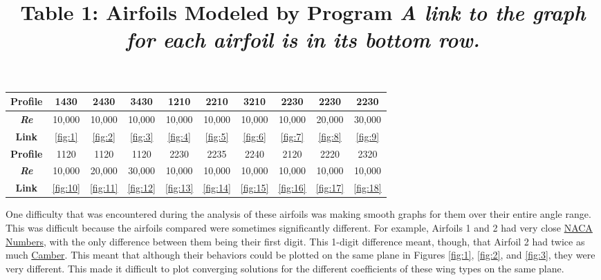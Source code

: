 \documentclass{article}
\begin{document}
\begin{table}[bp]
	\centering
	\title{Table 1: Airfoils Modeled by Program \newline}
	\title{\emph{A link to the graph for each airfoil is in its bottom row.}} \label{table:1}
	\begin{tabular}{ | c | c | c | c | c | c | c | c | c | c |}
		\hline
		 \textbf{Profile} & 1430 & 2430 & 3430 & 1210 & 2210 & 3210 & 2230 & 2230 & 2230 \\ \hline
		 \textbf{\emph{Re}} & 10,000 & 10,000 & 10,000 & 10,000 & 10,000 & 10,000 & 10,000 & 20,000 & 30,000 \\ 
		 \textbf{Link} & \ref{fig:1} & \ref{fig:2} & \ref{fig:3} & \ref{fig:4} & \ref{fig:5} & \ref{fig:6} & \ref{fig:7} & \ref{fig:8} & \ref{fig:9} \\ \hline \hline
		 \newline
		 \textbf{Profile} & 1120 & 1120 & 1120 & 2230 & 2235 & 2240 & 2120 & 2220 & 2320 \\ \hline
		 \textbf{\emph{Re}} & 10,000 & 20,000 & 30,000 & 10,000 & 10,000 & 10,000 & 10,000 & 10,000 & 10,000 \\ 
		 \textbf{Link} & \ref{fig:10} & \ref{fig:11} & \ref{fig:12} & \ref{fig:13} & \ref{fig:14} & \ref{fig:15} & \ref{fig:16} & \ref{fig:17} & \ref{fig:18} \\ \hline
	\end{tabular}
\end{table}

One difficulty that was encountered during the analysis of these airfoils was making smooth graphs for them over their entire angle range. This was difficult because the airfoils compared were sometimes significantly different. For example, Airfoils 1 and 2 had very close \hyperlink{NACA}{NACA Numbers}, with the only difference between them being their first digit. This 1-digit difference meant, though, that Airfoil 2 had twice as much \hyperlink{c}{Camber}. This meant that although their behaviors could be plotted on the same plane in Figures \ref{fig:1}, \ref{fig:2}, and \ref{fig:3}, they were very different. This made it difficult to plot converging solutions for the different coefficients of these wing types on the same plane.\newline
\end{document}
